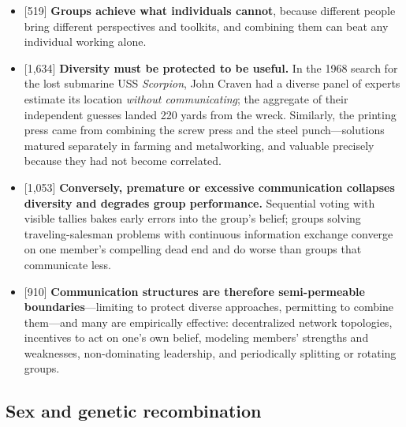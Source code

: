 \documentclass[11pt]{article}
\newcommand{\ct}[1]{{\footnotesize\color{black!55}[#1]}\hspace{1pt}}
\begin{document}
\begin{itemize}
  \item \ct{519} \textbf{Groups achieve what individuals cannot}, because different people bring different perspectives and toolkits, and combining them can beat any individual working alone.
  \item \ct{1,634} \textbf{Diversity must be protected to be useful.} In the 1968 search for the lost submarine USS \emph{Scorpion}, John Craven had a diverse panel of experts estimate its location \emph{without communicating}; the aggregate of their independent guesses landed 220 yards from the wreck. Similarly, the printing press came from combining the screw press and the steel punch---solutions matured separately in farming and metalworking, and valuable precisely because they had not become correlated.
  \item \ct{1,053} \textbf{Conversely, premature or excessive communication collapses diversity and degrades group performance.} Sequential voting with visible tallies bakes early errors into the group's belief; groups solving traveling-salesman problems with continuous information exchange converge on one member's compelling dead end and do worse than groups that communicate less.
  \item \ct{910} \textbf{Communication structures are therefore semi-permeable boundaries}---limiting to protect diverse approaches, permitting to combine them---and many are empirically effective: decentralized network topologies, incentives to act on one's own belief, modeling members' strengths and weaknesses, non-dominating leadership, and periodically splitting or rotating groups.
\end{itemize}

\subsection{Sex and genetic recombination}
\end{document}
